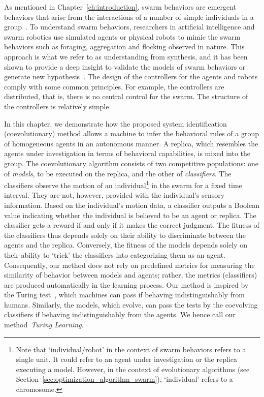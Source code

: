 As mentioned in Chapter~\ref{ch:introduction}, swarm behaviors are emergent behaviors that arise from the interactions of a number of simple individuals in a group~\cite{Camazine2001}. To understand swarm behaviors, researchers in artificial intelligence and swarm robotics use simulated agents or physical robots to mimic the swarm behaviors such as foraging, aggregation and flocking observed in nature. This approach is what we refer to as understanding from synthesis, and it has been shown to provide a deep insight to validate the models of swarm behaviors or generate new hypothesis~\cite{J.Halloy2007}. The design of the controllers for the agents and robots comply with some common principles. For example, the controllers are distributed, that is, there is no central control for the swarm. The structure of the controllers is relatively simple.

In this chapter, we demonstrate how the proposed system identification (coevolutionary) method allows a machine to infer the behavioral rules of a group of homogeneous agents in an autonomous manner. A replica, which resembles the agents under investigation in terms of behavioral capabilities, is mixed into the group. The coevolutionary algorithm consists of two competitive populations: one of \textit{models}, to be executed on the replica, and the other of \textit{classifiers}. The classifiers observe the motion of an individual\footnote{Note that `individual/robot' in the context of swarm behaviors refers to a single unit. It could refer to an agent under investigation or the replica executing a model. However, in the context of evolutionary algorithms (see Section~\ref{sec:optimization_algorithm_swarm}), `individual' refers to a chromosome.} in the swarm for a fixed time interval. They are not, however, provided with the individual's sensory information. Based on the individual's motion data, a classifier outputs a Boolean value indicating whether the individual is believed to be an agent or replica. The classifier gets a reward if and only if it makes the correct judgment. The fitness of the classifiers thus depends solely on their ability to discriminate between the agents and the replica. Conversely, the fitness of the models depends solely on their ability to `trick' the classifiers into categorizing them as an agent. Consequently, our method does not rely on predefined metrics for measuring the similarity of behavior between models and agents; rather, the metrics (classifiers) are produced automatically in the learning process. Our method is inspired by the Turing test~\cite{Turing1950, Harnad2000}, which machines can pass if behaving indistinguishably from humans. Similarly, the models, which evolve, can pass the tests by the coevolving classifiers if behaving indistinguishably from the agents. We hence call our method~\textit{Turing Learning}.

